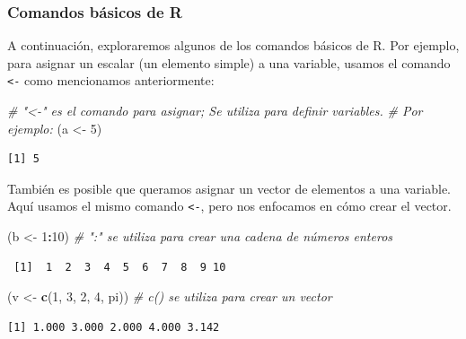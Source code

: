 \documentclass[12pt,spanish,]{book}
\newenvironment{Shaded}{\begin{snugshade}}{\end{snugshade}}
\newcommand{\CommentTok}[1]{\textcolor[rgb]{0.56,0.35,0.01}{\textit{#1}}}
\newcommand{\DecValTok}[1]{\textcolor[rgb]{0.00,0.00,0.81}{#1}}
\newcommand{\KeywordTok}[1]{\textcolor[rgb]{0.13,0.29,0.53}{\textbf{#1}}}
\newcommand{\NormalTok}[1]{#1}
\newcommand{\OperatorTok}[1]{\textcolor[rgb]{0.81,0.36,0.00}{\textbf{#1}}}
\newcommand{\StringTok}[1]{\textcolor[rgb]{0.31,0.60,0.02}{#1}}
\begin{document}
\hypertarget{comandos-buxe1sicos-de-r}{%
\subsubsection{Comandos básicos de R}\label{comandos-buxe1sicos-de-r}}

A continuación, exploraremos algunos de los comandos básicos de R. Por ejemplo, para asignar un escalar (un elemento simple) a una variable, usamos el comando \texttt{\textless{}-} como mencionamos anteriormente:

\begin{Shaded}
\begin{Highlighting}[]
\CommentTok{# "<-"  es el comando para asignar; Se utiliza para definir variables.}
\CommentTok{# Por ejemplo:}
\NormalTok{(a <-}\StringTok{ }\DecValTok{5}\NormalTok{)     }
\end{Highlighting}
\end{Shaded}

\begin{verbatim}
[1] 5
\end{verbatim}

También es posible que queramos asignar un vector de elementos a una variable. Aquí usamos el mismo comando \texttt{\textless{}-}, pero nos enfocamos en cómo crear el vector.

\begin{Shaded}
\begin{Highlighting}[]
\NormalTok{(b <-}\StringTok{ }\DecValTok{1}\OperatorTok{:}\DecValTok{10}\NormalTok{)              }\CommentTok{# ":"  se utiliza para crear una cadena de números enteros}
\end{Highlighting}
\end{Shaded}

\begin{verbatim}
 [1]  1  2  3  4  5  6  7  8  9 10
\end{verbatim}

\begin{Shaded}
\begin{Highlighting}[]
\NormalTok{(v <-}\StringTok{ }\KeywordTok{c}\NormalTok{(}\DecValTok{1}\NormalTok{, }\DecValTok{3}\NormalTok{, }\DecValTok{2}\NormalTok{, }\DecValTok{4}\NormalTok{, pi))   }\CommentTok{#  c() se utiliza para crear un vector }
\end{Highlighting}
\end{Shaded}

\begin{verbatim}
[1] 1.000 3.000 2.000 4.000 3.142
\end{verbatim}
\end{document}
